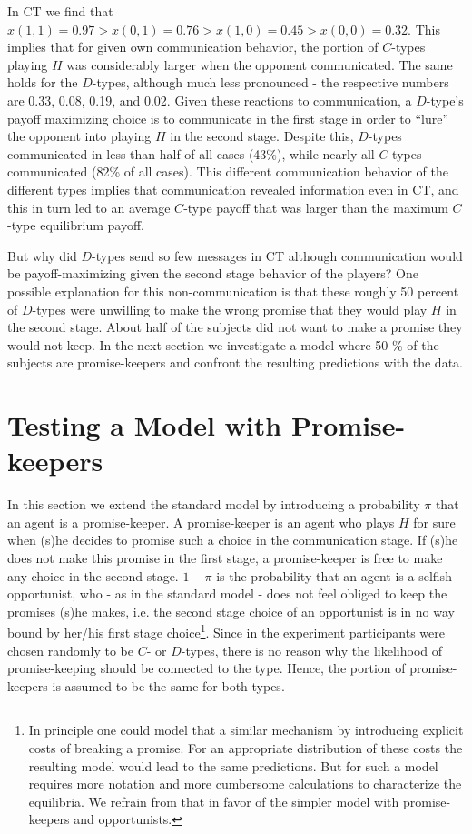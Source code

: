 \documentclass[12pt]{article}
\theoremstyle{break}
\begin{document}
In CT we find that $x(1,1)=0.97 > x(0,1)=0.76 > x(1,0)=0.45 > x(0,0)= 0.32$. This implies that for given own communication behavior, the portion of $C$-types playing $H$ was considerably larger when the opponent communicated. The same holds for the $D$-types, although much less pronounced - the respective numbers are 0.33, 0.08, 0.19, and 0.02. Given these reactions to communication, a $D$-type's payoff maximizing choice is to communicate in the first stage in order to ``lure'' the opponent into playing $H$ in the second stage. Despite this, $D$-types communicated in less than half of all cases (43\%), while nearly all $C$-types communicated (82\% of all cases). This different communication behavior of the different types implies that communication revealed information even in CT, and this in turn led to an average $C$-type payoff that was larger than the maximum $C$-type equilibrium payoff. 

But why did $D$-types send so few messages in CT although communication would be payoff-maximizing given the second stage behavior of the players? One possible explanation for this non-communication is that these roughly 50 percent of $D$-types were unwilling to make the wrong promise that they would play $H$ in the second stage.
About half  of the subjects did not want to make a promise they would not keep. In the next section we investigate a model where 50 \% of the subjects are promise-keepers and confront the resulting predictions with the data.

\section{Testing a Model with Promise-keepers}\label{sec:promises}

In this section we extend the standard model by introducing a probability $\pi$ that an agent is a promise-keeper. A promise-keeper is an agent who plays $H$ for sure when (s)he decides to promise such a choice in the communication stage. If (s)he does not make this promise in the first stage, a promise-keeper is free to make any choice in the second stage. $1-\pi$ is the probability that an agent is a selfish opportunist, who - as in the standard model - does not feel obliged to keep the promises (s)he makes, i.e. the second stage choice of an opportunist is in no way bound by her/his first stage choice\footnote{%
In principle one could model that a similar mechanism by introducing explicit costs of breaking a promise. For an appropriate distribution of these costs the resulting model would lead to the same predictions. But for such a model requires more notation and more cumbersome calculations to characterize the equilibria. We refrain from that in favor of the simpler model with promise-keepers and opportunists.}.
Since in the experiment participants were chosen randomly to be $C$- or $D$-types, there is no reason why the likelihood of promise-keeping should be connected to the type. Hence, the portion of promise-keepers is assumed to be the same for both types.
\end{document}
